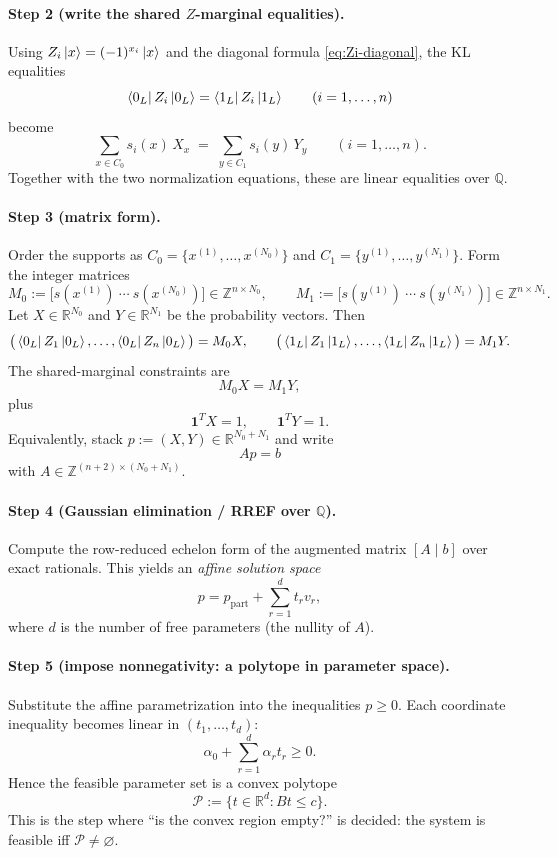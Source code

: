 \documentclass[11pt]{article}
\begin{document}
\paragraph{Step 2 (write the shared $Z$-marginal equalities).}
Using $Z_i\ket{x}=(-1)^{x_i}\ket{x}$ and the diagonal formula \eqref{eq:Zi-diagonal}, the KL equalities
\[
\bra{0_L}Z_i\ket{0_L}=\bra{1_L}Z_i\ket{1_L}\qquad (i=1,\dots,n)
\]
become
\[
\sum_{x\in C_0} s_i(x)\,X_x\;=\;\sum_{y\in C_1} s_i(y)\,Y_y\qquad (i=1,\dots,n).
\]
Together with the two normalization equations, these are linear equalities over $\mathbb{Q}$.

\paragraph{Step 3 (matrix form).}
Order the supports as $C_0=\{x^{(1)},\dots,x^{(N_0)}\}$ and $C_1=\{y^{(1)},\dots,y^{(N_1)}\}$. Form the integer matrices
\[
M_0:=\big[s(x^{(1)})\ \cdots\ s(x^{(N_0)})\big]\in\mathbb{Z}^{n\times N_0},
\qquad
M_1:=\big[s(y^{(1)})\ \cdots\ s(y^{(N_1)})\big]\in\mathbb{Z}^{n\times N_1}.
\]
Let $X\in\mathbb{R}^{N_0}$ and $Y\in\mathbb{R}^{N_1}$ be the probability vectors. Then
\[
\big(\bra{0_L}Z_1\ket{0_L},\dots,\bra{0_L}Z_n\ket{0_L}\big)=M_0X,
\qquad
\big(\bra{1_L}Z_1\ket{1_L},\dots,\bra{1_L}Z_n\ket{1_L}\big)=M_1Y.
\]
The shared-marginal constraints are
\begin{equation}
\label{eq:matrix-ZKL}
M_0X=M_1Y,
\end{equation}
plus
\begin{equation}
\label{eq:matrix-norm}
\mathbf{1}^TX=1,\qquad \mathbf{1}^TY=1.
\end{equation}
Equivalently, stack $p:=(X,Y)\in\mathbb{R}^{N_0+N_1}$ and write
\[
A p=b
\]
with $A\in\mathbb{Z}^{(n+2)\times(N_0+N_1)}$.

\paragraph{Step 4 (Gaussian elimination / RREF over $\mathbb{Q}$).}
Compute the row-reduced echelon form of the augmented matrix $[A\mid b]$ over exact rationals. This yields an \emph{affine solution space}
\[
 p=p_{\mathrm{part}}+\sum_{r=1}^d t_r v_r,
\]
where $d$ is the number of free parameters (the nullity of $A$).

\paragraph{Step 5 (impose nonnegativity: a polytope in parameter space).}
Substitute the affine parametrization into the inequalities $p\ge 0$. Each coordinate inequality becomes linear in $(t_1,\dots,t_d)$:
\[
\alpha_0+\sum_{r=1}^d \alpha_r t_r\ge 0.
\]
Hence the feasible parameter set is a convex polytope
\[
\mathcal{P}:=\{t\in\mathbb{R}^d: Bt\le c\}.
\]
This is the step where ``is the convex region empty?'' is decided: the system is feasible iff $\mathcal{P}\neq\varnothing$.
\end{document}
